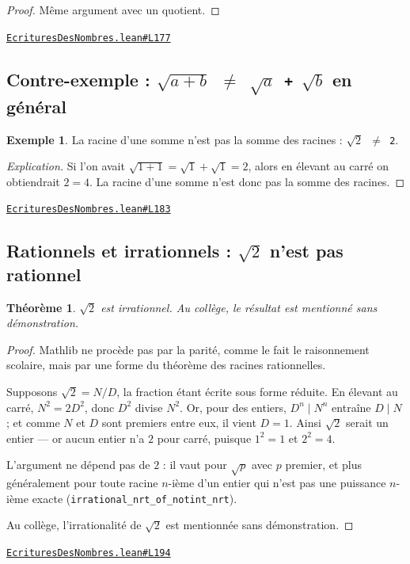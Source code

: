 \documentclass[11pt,a4paper]{article}
\theoremstyle{definition}
\newtheorem{exemple}{Exemple}
\theoremstyle{plain}
\newtheorem{theoreme}{Théorème}
\newenvironment{explication}{\begin{proof}[Explication]}{\end{proof}}
\newcommand{\source}[2]{\par\smallskip\noindent\hfill{\footnotesize\href{#1}{\texttt{#2}}}\par\smallskip}
\begin{document}
\begin{proof}
Même argument avec un quotient.
\end{proof}
\source{https://github.com/Commutator-IO/learn-lean/blob/main/courses/01-college/01-nombres-et-calculs/EcrituresDesNombres.lean\#L177}{EcrituresDesNombres.lean\#L177}

\subsection{Contre-exemple : \texttt{\(\sqrt{a + b}\) \(\ne\) \(\sqrt{a}\) + \(\sqrt{b}\)} en général}

\begin{exemple}
La racine d'une somme n'est pas la somme des racines : \texttt{\(\sqrt{2}\) \(\ne\) 2}.
\end{exemple}

\begin{explication}
Si l'on avait $\sqrt{1+1} = \sqrt1 + \sqrt1 = 2$, alors en élevant au carré on
obtiendrait $2 = 4$. La racine d'une somme n'est donc pas la somme des racines.
\end{explication}
\source{https://github.com/Commutator-IO/learn-lean/blob/main/courses/01-college/01-nombres-et-calculs/EcrituresDesNombres.lean\#L183}{EcrituresDesNombres.lean\#L183}

\subsection{Rationnels et irrationnels : \texttt{\(\sqrt{2}\)} n'est pas rationnel}

\begin{theoreme}
\texttt{\(\sqrt{2}\)} est irrationnel. Au collège, le résultat est mentionné sans démonstration.
\end{theoreme}

\begin{proof}
Mathlib ne procède pas par la parité, comme le fait le raisonnement scolaire, mais par une
forme du théorème des racines rationnelles.

Supposons $\sqrt 2 = N/D$, la fraction étant écrite sous forme réduite. En élevant au carré,
$N^2 = 2D^2$, donc $D^2$ divise $N^2$. Or, pour des entiers, $D^n \mid N^n$ entraîne
$D \mid N$ ; et comme $N$ et $D$ sont premiers entre eux, il vient $D = 1$. Ainsi $\sqrt 2$
serait un entier — or aucun entier n'a $2$ pour carré, puisque $1^2 = 1$ et $2^2 = 4$.

L'argument ne dépend pas de $2$ : il vaut pour $\sqrt p$ avec $p$ premier, et plus
généralement pour toute racine $n$-ième d'un entier qui n'est pas une puissance $n$-ième
exacte (\texttt{irrational\_nrt\_of\_notint\_nrt}).

Au collège, l'irrationalité de $\sqrt 2$ est mentionnée sans démonstration.
\end{proof}
\source{https://github.com/Commutator-IO/learn-lean/blob/main/courses/01-college/01-nombres-et-calculs/EcrituresDesNombres.lean\#L194}{EcrituresDesNombres.lean\#L194}
\end{document}
